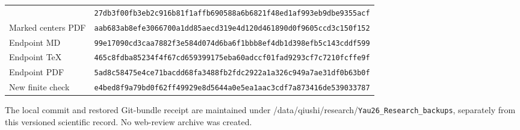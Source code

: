\documentclass[
  10pt,
]{article}
\begin{document}
\begin{longtable}[]{@{}>{\raggedright\arraybackslash}p{\dimexpr(\linewidth-2\tabcolsep)/2\relax}>{\raggedright\arraybackslash}p{\dimexpr(\linewidth-2\tabcolsep)/2\relax}@{}}
\begin{minipage}[t]{0.47\columnwidth}
\end{minipage} & \begin{minipage}[t]{0.47\columnwidth}\raggedright
\nolinkurl{27db3f00fb3eb2c916b81f1affb690588a6b6821f48ed1af993eb9dbe9355acf}\strut
\end{minipage}\tabularnewline
\begin{minipage}[t]{0.47\columnwidth}\raggedright
Marked centers PDF\strut
\end{minipage} & \begin{minipage}[t]{0.47\columnwidth}\raggedright
\nolinkurl{aab683ab8efe3066700a1dd85aecd319e4d120d461890d0f9605ccd3c150f152}\strut
\end{minipage}\tabularnewline
\begin{minipage}[t]{0.47\columnwidth}\raggedright
Endpoint MD\strut
\end{minipage} & \begin{minipage}[t]{0.47\columnwidth}\raggedright
\nolinkurl{99e17090cd3caa7882f3e584d074d6ba6f1bbb8ef4db1d398efb5c143cddf599}\strut
\end{minipage}\tabularnewline
\begin{minipage}[t]{0.47\columnwidth}\raggedright
Endpoint TeX\strut
\end{minipage} & \begin{minipage}[t]{0.47\columnwidth}\raggedright
\nolinkurl{465c8fdba85234f4f67cd659399175eba60adccf01fad9293cf7c7210fcffe9f}\strut
\end{minipage}\tabularnewline
\begin{minipage}[t]{0.47\columnwidth}\raggedright
Endpoint PDF\strut
\end{minipage} & \begin{minipage}[t]{0.47\columnwidth}\raggedright
\nolinkurl{5ad8c58475e4ce71bacdd68fa3488fb2fdc2922a1a326c949a7ae31df0b63b0f}\strut
\end{minipage}\tabularnewline
\begin{minipage}[t]{0.47\columnwidth}\raggedright
New finite check\strut
\end{minipage} & \begin{minipage}[t]{0.47\columnwidth}\raggedright
\nolinkurl{e4bed8f9a79bd0f62ff49929e8d5644a0e5ea1aac3cdf7a873416de539033787}\strut
\end{minipage}\tabularnewline
\bottomrule
\end{longtable}

The local commit and restored Git-bundle receipt are maintained under
/data/qiushi/research/\nolinkurl{Yau26_Research_backups}, separately from this
versioned scientific record. No web-review archive was created.
\end{document}
